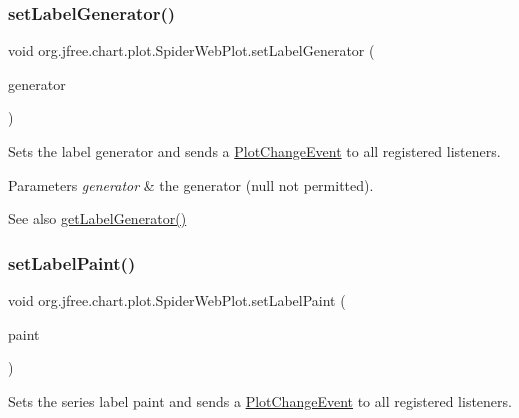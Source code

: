 \subsubsection{\texorpdfstring{set\+Label\+Generator()}{setLabelGenerator()}}
{\footnotesize\ttfamily void org.\+jfree.\+chart.\+plot.\+Spider\+Web\+Plot.\+set\+Label\+Generator (\begin{DoxyParamCaption}\item[{\mbox{\hyperlink{interfaceorg_1_1jfree_1_1chart_1_1labels_1_1_category_item_label_generator}{Category\+Item\+Label\+Generator}}}]{generator }\end{DoxyParamCaption})}

Sets the label generator and sends a \mbox{\hyperlink{}{Plot\+Change\+Event}} to all registered listeners.


\begin{DoxyParams}{Parameters}
{\em generator} & the generator ({\ttfamily null} not permitted).\\
\hline
\end{DoxyParams}
\begin{DoxySeeAlso}{See also}
\mbox{\hyperlink{classorg_1_1jfree_1_1chart_1_1plot_1_1_spider_web_plot_a489c44a3be5faba2861730381c3b769e}{get\+Label\+Generator()}} 
\end{DoxySeeAlso}
\mbox{\label{classorg_1_1jfree_1_1chart_1_1plot_1_1_spider_web_plot_a360a2dd69ff25f10ec2f33cdc9602a0a}} 
\subsubsection{\texorpdfstring{set\+Label\+Paint()}{setLabelPaint()}}
{\footnotesize\ttfamily void org.\+jfree.\+chart.\+plot.\+Spider\+Web\+Plot.\+set\+Label\+Paint (\begin{DoxyParamCaption}\item[{Paint}]{paint }\end{DoxyParamCaption})}

Sets the series label paint and sends a \mbox{\hyperlink{}{Plot\+Change\+Event}} to all registered listeners.


